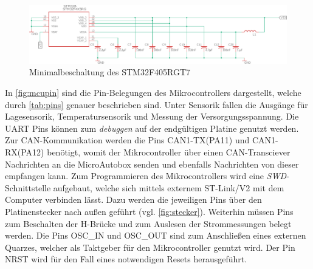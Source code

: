 \begin{figure}[H]%
\centering
\includegraphics[width=\columnwidth]{./Bilder/MCU_MIN.pdf}%
\caption{Minimalbeschaltung des STM32F405RGT7}%
\label{fig:mcumin}%
\end{figure}\noindent
In \autoref{fig:mcupin} sind die Pin-Belegungen des Mikrocontrollers dargestellt, welche durch \autoref{tab:pins} genauer beschrieben sind. Unter Sensorik fallen die Ausgänge für Lagesensorik, Temperatursensorik und Messung der Versorgungsspannung. Die UART Pins können zum \textit{debuggen} auf der endgültigen Platine genutzt werden. Zur CAN-Kommunikation werden die Pins CAN1-TX(PA11) und CAN1-RX(PA12) benötigt, womit der Mikrocontroller über einen CAN-Transciever Nachrichten an die MicroAutobox senden und ebenfalls Nachrichten von dieser empfangen kann. Zum Programmieren des Mikrocontrollers wird eine \textit{SWD}-Schnittstelle aufgebaut, welche sich mittels externem ST-Link/V2 mit dem Computer verbinden lässt. Dazu werden die jeweiligen Pins über den Platinenstecker nach außen geführt (vgl. \autoref{fig:stecker}). Weiterhin müssen Pins zum Beschalten der H-Brücke und zum Auslesen der Strommessungen belegt werden. Die Pins OSC\_IN und OSC\_OUT sind zum Anschließen eines externen Quarzes, welcher als Taktgeber für den Mikrocontroller genutzt wird. Der Pin NRST wird für den Fall eines notwendigen Resets herausgeführt.

